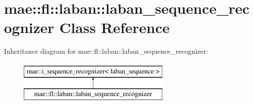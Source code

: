 \hypertarget{classmae_1_1fl_1_1laban_1_1laban__sequence__recognizer}{\section{mae\-:\-:fl\-:\-:laban\-:\-:laban\-\_\-sequence\-\_\-recognizer Class Reference}
\label{classmae_1_1fl_1_1laban_1_1laban__sequence__recognizer}
}
Inheritance diagram for mae\-:\-:fl\-:\-:laban\-:\-:laban\-\_\-sequence\-\_\-recognizer\-:\begin{figure}[H]
\begin{center}
\leavevmode
\includegraphics[height=2.000000cm]{classmae_1_1fl_1_1laban_1_1laban__sequence__recognizer}
\end{center}
\end{figure}
